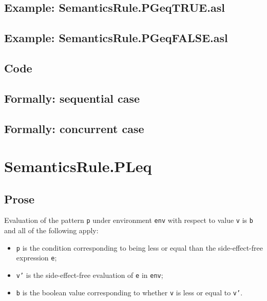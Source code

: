 \documentclass{book}
\begin{document}
    \subsection{Example: SemanticsRule.PGeqTRUE.asl}

    \subsection{Example: SemanticsRule.PGeqFALSE.asl}

  \subsection{Code}

\begin{emptyformal}
  \subsection{Formally: sequential case}

  \subsection{Formally: concurrent case}
\end{emptyformal}


\section{SemanticsRule.PLeq \label{sec:SemanticsRule.PLeq}}

    \subsection{Prose}
    Evaluation of the pattern \texttt{p} under environment \texttt{env} with
    respect to value \texttt{v} is \texttt{b} and all of the following apply:
    \begin{itemize}
      \item \texttt{p} is the condition corresponding to being less or equal
        than the side-effect-free expression \texttt{e};
      \item \texttt{v'} is the side-effect-free evaluation of \texttt{e} in
        \texttt{env};
      \item \texttt{b} is the boolean value corresponding to whether \texttt{v}
        is less or equal to \texttt{v'}.
    \end{itemize}
\end{document}
